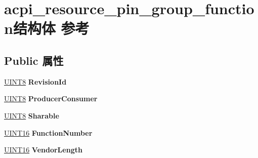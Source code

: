 \hypertarget{structacpi__resource__pin__group__function}{}\section{acpi\+\_\+resource\+\_\+pin\+\_\+group\+\_\+function结构体 参考}
\label{structacpi__resource__pin__group__function}
\subsection*{Public 属性}
\begin{DoxyCompactItemize}
\item 
\mbox{\label{structacpi__resource__pin__group__function_acaccbe27a79868f49b8eba63e86cf402}} 
\hyperlink{_processor_bind_8h_ab27e9918b538ce9d8ca692479b375b6a}{U\+I\+N\+T8} {\bfseries Revision\+Id}
\item 
\mbox{\label{structacpi__resource__pin__group__function_ad9f219d0e679e5bce95a3331eb7e564c}} 
\hyperlink{_processor_bind_8h_ab27e9918b538ce9d8ca692479b375b6a}{U\+I\+N\+T8} {\bfseries Producer\+Consumer}
\item 
\mbox{\label{structacpi__resource__pin__group__function_a2f75b1a8a521cfc0d5b701a03a068e2d}} 
\hyperlink{_processor_bind_8h_ab27e9918b538ce9d8ca692479b375b6a}{U\+I\+N\+T8} {\bfseries Sharable}
\item 
\mbox{\label{structacpi__resource__pin__group__function_a111ac9927495cf23be393adfc8415ab9}} 
\hyperlink{_processor_bind_8h_a09f1a1fb2293e33483cc8d44aefb1eb1}{U\+I\+N\+T16} {\bfseries Function\+Number}
\item 
\mbox{\label{structacpi__resource__pin__group__function_a3cac0a1a824e732865853e1ba24de9a5}} 
\hyperlink{_processor_bind_8h_a09f1a1fb2293e33483cc8d44aefb1eb1}{U\+I\+N\+T16} {\bfseries Vendor\+Length}
\item 
\mbox{\label{structacpi__resource__pin__group__function_a36b36de571bce6c0b958626656f17038}} 

\end{DoxyCompactItemize}
